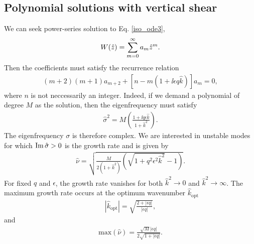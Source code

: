 \subsection{Polynomial solutions with vertical shear}
We can seek power-series solution to Eq. \ref{iso_ode3},
\begin{align}
  W(\hat{z}) = \sum_{m=0}^\infty a_m\hat{z}^m. 
\end{align}
Then the coefficients must satisfy the recurrence relation
\begin{align}
  (m+2)(m+1)a_{m+2} +
  \left[n - m\left(1+\ii \epsilon q  \hat{k}\right)\right] a_m = 0, 
\end{align}
where $n$ is not neccessarily an integer. Indeed, if we demand
a polynomial of degree $M$ as the solution, then the eigenfrequency
must satisfy
\begin{align}
\hat{\sigma}^2 = M\left(\frac{1+\ii q \epsilon
    \hat{k}}{1+\hat{k}^2}\right).
\end{align}
The eigenfrequency $\sigma$ is therefore complex. We are interested in
unstable modes for which $\operatorname{Im}{\hat{\sigma}}>0$ is the growth rate and is
given by 
\begin{align}\label{simple_growth}
  \hat{\nu} =\sqrt{
   \frac{M}{2\left(1+\hat{k}^2\right)}\left(\sqrt{1+q^2\epsilon^2\hat{k}^2} - 
    1\right)}. 
\end{align}
For fixed $q$ and $\epsilon$, the growth rate vanishes for both
$\hat{k}^2\to0$ and $\hat{k}^2\to\infty$. The maximum growth rate
occurs at the optimum wavenumber $\hat{k}_\mathrm{opt}$
\begin{align}
  |\hat{k}_\mathrm{opt}| = \sqrt{\frac{2+|\epsilon q|}{|\epsilon q|}},
\end{align}
and
\begin{align}
\mathrm{max}\left(\hat{\nu}\right) =\frac{\sqrt{M}|\epsilon
  q|}{2\sqrt{1+|\epsilon q|}}. 
\end{align}



